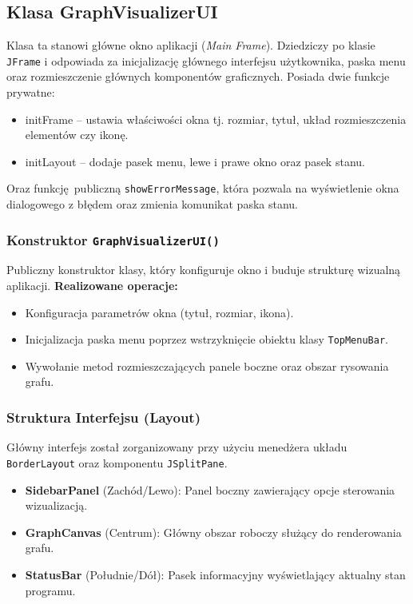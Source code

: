 \documentclass[]{article}
\begin{document}
    \subsection{Klasa GraphVisualizerUI}
    Klasa ta stanowi główne okno aplikacji (\textit{Main Frame}). Dziedziczy po klasie \texttt{JFrame} i odpowiada za inicjalizację głównego interfejsu użytkownika, paska menu oraz rozmieszczenie głównych komponentów graficznych. Posiada dwie funkcje prywatne:
    \begin{itemize}
        \item initFrame -- ustawia właściwości okna tj. rozmiar, tytuł, układ rozmieszczenia elementów czy ikonę.
        \item initLayout -- dodaje pasek menu, lewe i prawe okno oraz pasek stanu.
    \end{itemize}
    Oraz funkcję publiczną \texttt{showErrorMessage}, która pozwala na wyświetlenie okna dialogowego z błędem oraz zmienia komunikat paska stanu.

    \subsubsection{Konstruktor \texttt{GraphVisualizerUI()}}
    Publiczny konstruktor klasy, który konfiguruje okno i buduje strukturę wizualną aplikacji.
    \textbf{Realizowane operacje:}
    \begin{itemize}
    \item Konfiguracja parametrów okna (tytuł, rozmiar, ikona).
    \item Inicjalizacja paska menu poprzez wstrzyknięcie obiektu klasy \texttt{TopMenuBar}.
    \item Wywołanie metod rozmieszczających panele boczne oraz obszar rysowania grafu.
    \end{itemize}

    \subsubsection{Struktura Interfejsu (Layout)}
    Główny interfejs został zorganizowany przy użyciu menedżera układu \texttt{BorderLayout} oraz komponentu \texttt{JSplitPane}.
    \begin{itemize}
    \item \textbf{SidebarPanel} (Zachód/Lewo): Panel boczny zawierający opcje sterowania wizualizacją.
    \item \textbf{GraphCanvas} (Centrum): Główny obszar roboczy służący do renderowania grafu.
    \item \textbf{StatusBar} (Południe/Dół): Pasek informacyjny wyświetlający aktualny stan programu.
    \end{itemize}
\end{document}
